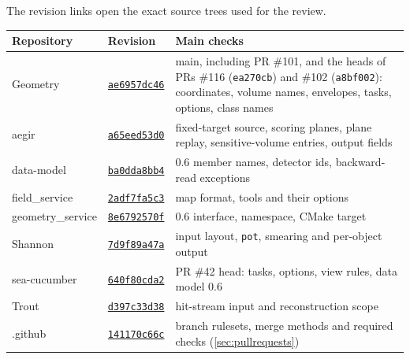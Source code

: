 The revision links open the exact source trees used for the review.
\begin{center}\small
\begin{tabularx}{\linewidth}{l l L}
\toprule Repository & Revision & Main checks \\ \midrule
Geometry & \href{https://github.com/ShipSoft/Geometry/tree/ae6957dc46c6b5836cab88f859d4cbfbd59ca1ee}{\texttt{ae6957dc46}} & main, including PR \#101, and the heads of PRs \#116 (\texttt{ea270cb}) and \#102 (\texttt{a8bf002}): coordinates, volume names, envelopes, tasks,  options, class names \\
aegir & \href{https://github.com/ShipSoft/aegir/tree/a65eed53d03ce14b68df49d3f922c04c283367d3}{\texttt{a65eed53d0}} & fixed-target source, scoring planes, plane replay, sensitive-volume entries, output fields \\
data-model & \href{https://github.com/ShipSoft/data-model/tree/ba0dda8bb4b43b9d2a2ded3ede57bdb519ae8d12}{\texttt{ba0dda8bb4}} & 0.6 member names, detector ids, backward-read exceptions \\
field\_service & \href{https://github.com/ShipSoft/field_service/tree/2adf7fa5c37f5b43c417d009fad56e1422770358}{\texttt{2adf7fa5c3}} & map format, tools and their options \\
geometry\_service & \href{https://github.com/ShipSoft/geometry_service/tree/8e6792570fad3dce7349aeb992e734f860b1356f}{\texttt{8e6792570f}} & 0.6 interface, namespace, CMake target \\
Shannon & \href{https://github.com/ShipSoft/Shannon/tree/7d9f89a47a09c6865124e532c49ef9206661da57}{\texttt{7d9f89a47a}} & input layout, \texttt{pot}, smearing and per-object output \\
sea-cucumber & \href{https://github.com/ShipSoft/sea-cucumber/tree/640f80cda2104951abd9d3a9781c11fa12eeadce}{\texttt{640f80cda2}} & PR \#42 head: tasks, options, view rules, data model 0.6 \\
Trout & \href{https://github.com/ShipSoft/Trout/tree/d397c33d38108e7beaf4e32d9c46b7151200e886}{\texttt{d397c33d38}} & hit-stream input and reconstruction scope \\
.github & \href{https://github.com/ShipSoft/.github/tree/141170c66caa785af6b5cf30551359dc47e994c1}{\texttt{141170c66c}} & branch rulesets, merge methods and required checks (\cref{sec:pullrequests}) \\
\bottomrule\end{tabularx}\end{center}

